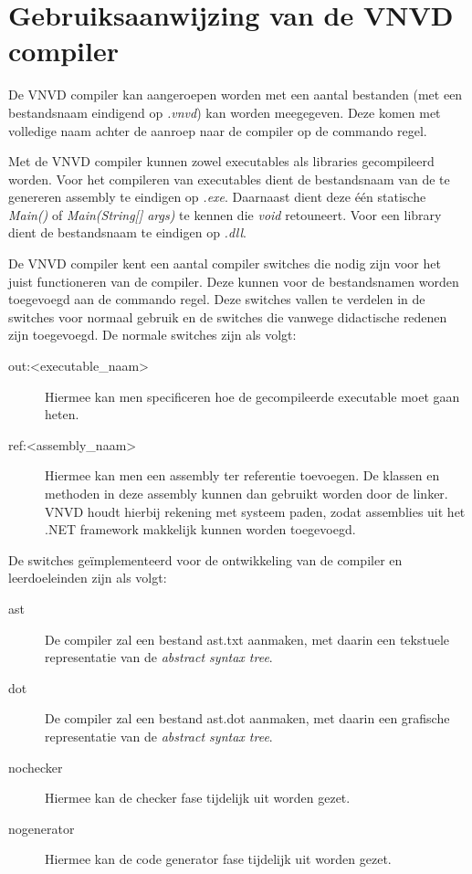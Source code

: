 \section{Gebruiksaanwijzing van de VNVD compiler}
De VNVD compiler kan aangeroepen worden met een aantal bestanden (met een bestandsnaam eindigend op \textit{.vnvd}) kan worden meegegeven. Deze komen met volledige naam achter de aanroep naar de compiler op de commando regel.

Met de VNVD compiler kunnen zowel executables als libraries gecompileerd worden. Voor het compileren van executables dient de bestandsnaam van de te genereren assembly te eindigen op \textit{.exe}. Daarnaast dient deze \'e\'en statische \textit{Main()} of \textit{Main(String[] args)} te kennen die \textit{void} retouneert. Voor een library dient de bestandsnaam te eindigen op \textit{.dll}.

De VNVD compiler kent een aantal compiler switches die nodig zijn voor het juist functioneren van de compiler. Deze kunnen voor de bestandsnamen worden toegevoegd aan de commando regel. Deze switches vallen te verdelen in de switches voor normaal gebruik en de switches die vanwege didactische redenen zijn toegevoegd. De normale switches zijn als volgt:

\begin{description}
	\item[\textminus\textminus{}out:\textless{}executable\_naam\textgreater{}] Hiermee kan men specificeren hoe de gecompileerde executable moet gaan heten.
	\item[\textminus\textminus{}ref:\textless{}assembly\_naam\textgreater{}] Hiermee kan men een assembly ter referentie toevoegen. De klassen en methoden in deze assembly kunnen dan gebruikt worden door de linker. VNVD houdt hierbij rekening met systeem paden, zodat assemblies uit het .NET framework makkelijk kunnen worden toegevoegd.
\end{description}

De switches ge\"implementeerd voor de ontwikkeling van de compiler en leerdoeleinden zijn als volgt:

\begin{description}
	\item[\textminus\textminus{}ast] De compiler zal een bestand ast.txt aanmaken, met daarin een tekstuele representatie van de \textit{abstract syntax tree}.
	\item[\textminus\textminus{}dot] De compiler zal een bestand ast.dot aanmaken, met daarin een grafische representatie van de \textit{abstract syntax tree}.
	\item[\textminus\textminus{}nochecker] Hiermee kan de checker fase tijdelijk uit worden gezet.
	\item[\textminus\textminus{}nogenerator] Hiermee kan de code generator fase tijdelijk uit worden gezet.
\end{description}

